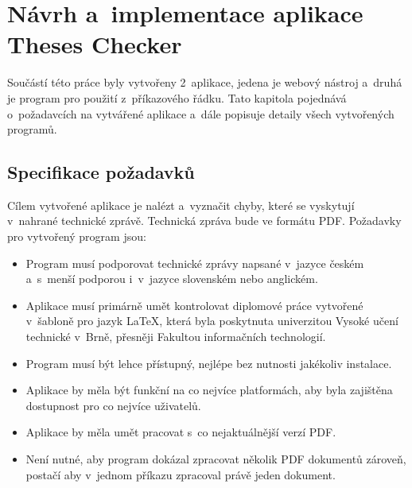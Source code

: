 



\chapter{Návrh a~implementace aplikace Theses Checker} \label{design_implementation}
Součástí této práce byly vytvořeny 2~aplikace, jedena je webový nástroj a~druhá je
program pro použití z~příkazového řádku. Tato kapitola pojednává o~požadavcích na 
vytvářené aplikace a~dále popisuje detaily všech vytvořených programů.


\section{Specifikace požadavků}
Cílem vytvořené aplikace je nalézt a~vyznačit chyby, které se vyskytují
v~nahrané technické zprávě. Technická zpráva bude ve formátu PDF.
Požadavky pro vytvořený program jsou:
\begin{itemize}
    \item Program musí podporovat technické zprávy napsané v~jazyce českém
    a~s~menší podporou i~v~jazyce slovenském nebo anglickém.

    \item Aplikace musí primárně umět kontrolovat diplomové práce vytvořené
    v~šabloně pro jazyk {\LaTeX}, která byla
    poskytnuta univerzitou Vysoké učení technické v~Brně, přesněji Fakultou
    informačních technologií.

    \item Program musí být lehce přístupný, nejlépe bez nutnosti
    jakékoliv instalace.
    
    \item Aplikace by měla být funkční na co nejvíce platformách, aby byla
    zajištěna dostupnost pro co nejvíce uživatelů.

    \item Aplikace by měla umět pracovat s~co nejaktuálnější verzí PDF.
    
    \item Není nutné, aby program dokázal zpracovat několik PDF dokumentů
    zároveň, postačí aby v~jednom příkazu zpracoval právě jeden dokument.
\end{itemize}

